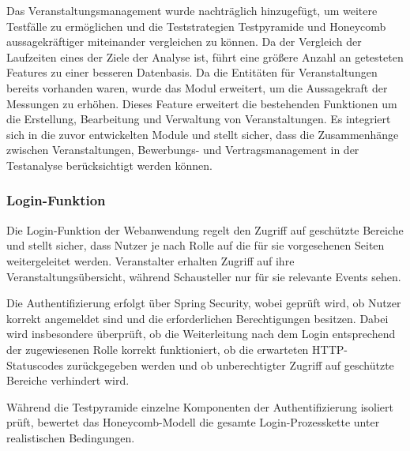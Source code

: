 Das Veranstaltungsmanagement wurde nachträglich hinzugefügt, um weitere Testfälle zu ermöglichen und die Teststrategien Testpyramide und Honeycomb aussagekräftiger miteinander vergleichen zu können. Da der Vergleich der Laufzeiten eines der Ziele der Analyse ist, führt eine größere Anzahl an getesteten Features zu einer besseren Datenbasis. Da die Entitäten für Veranstaltungen bereits vorhanden waren, wurde das Modul erweitert, um die Aussagekraft der Messungen zu erhöhen.
Dieses Feature erweitert die bestehenden Funktionen um die Erstellung, Bearbeitung und Verwaltung von Veranstaltungen. Es integriert sich in die zuvor entwickelten Module und stellt sicher, dass die Zusammenhänge zwischen Veranstaltungen, Bewerbungs- und Vertragsmanagement in der Testanalyse berücksichtigt werden können.


\subsubsection{Login-Funktion}
Die Login-Funktion der Webanwendung regelt den Zugriff auf geschützte Bereiche und stellt sicher, dass Nutzer je nach Rolle auf die für sie vorgesehenen Seiten weitergeleitet werden. Veranstalter erhalten Zugriff auf ihre Veranstaltungsübersicht, während Schausteller nur für sie relevante Events sehen.

Die Authentifizierung erfolgt über Spring Security, wobei geprüft wird, ob Nutzer korrekt angemeldet sind und die erforderlichen Berechtigungen besitzen. Dabei wird insbesondere überprüft, ob die Weiterleitung nach dem Login entsprechend der zugewiesenen Rolle korrekt funktioniert, ob die erwarteten HTTP-Statuscodes zurückgegeben werden und ob unberechtigter Zugriff auf geschützte Bereiche verhindert wird.

Während die Testpyramide einzelne Komponenten der Authentifizierung isoliert prüft, bewertet das Honeycomb-Modell die gesamte Login-Prozesskette unter realistischen Bedingungen.






